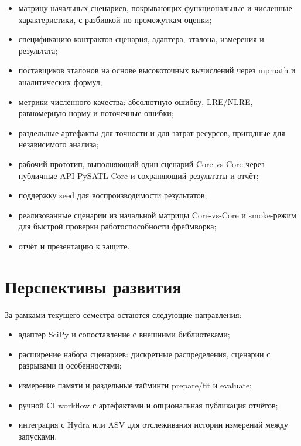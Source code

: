 \documentclass[12pt,a4paper]{article}
\begin{document}
\begin{itemize}
  \item матрицу начальных сценариев, покрывающих функциональные
        и численные характеристики, с разбивкой по промежуткам
        оценки;
  \item спецификацию контрактов сценария, адаптера, эталона, измерения
        и результата;
  \item поставщиков эталонов на основе высокоточных вычислений через
        mpmath и аналитических формул;
  \item метрики численного качества: абсолютную ошибку, LRE/NLRE,
      равномерную норму и поточечные ошибки;
  \item раздельные артефакты для точности и для затрат ресурсов,
      пригодные для независимого анализа;
  \item рабочий прототип, выполняющий один сценарий Core-vs-Core
        через публичные API PySATL Core и сохраняющий результаты
        и отчёт;
  \item поддержку seed для воспроизводимости результатов;
  \item реализованные сценарии из начальной матрицы Core-vs-Core
        и smoke-режим для быстрой проверки работоспособности
        фреймворка;
  \item отчёт и презентацию к защите.
\end{itemize}
\newpage

\section{Перспективы развития}
\label{sec:future}
За рамками текущего семестра остаются следующие направления:

\begin{itemize}
  \item адаптер SciPy и сопоставление с внешними библиотеками;
  \item расширение набора сценариев: дискретные распределения,
        сценарии с разрывами и особенностями;
  \item измерение памяти и раздельные тайминги prepare/fit и evaluate;
  \item ручной CI workflow с артефактами и опциональная публикация
        отчётов;
  \item интеграция с Hydra или ASV для отслеживания истории
        измерений между запусками.
\end{itemize}
\newpage
\end{document}
